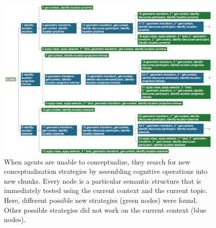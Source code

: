 \begin{figure}
\begin{center}
\includegraphics[width=1.0\columnwidth]{figs/conceptualization-strategy-invention-1.png}
\end{center}
\caption[Search for new conceptualization strategies]{%
When agents are unable to conceptualize, they search for new 
conceptualization strategies by assembling cognitive operations 
into new chunks. Every node is a particular
semantic structure that is immediately tested using the current context and
the current topic. Here, different possible new strategies (green nodes) were found. 
Other possible strategies did not work on the current context (blue nodes).}
\label{f:strategy-invention-1}
\end{figure}

